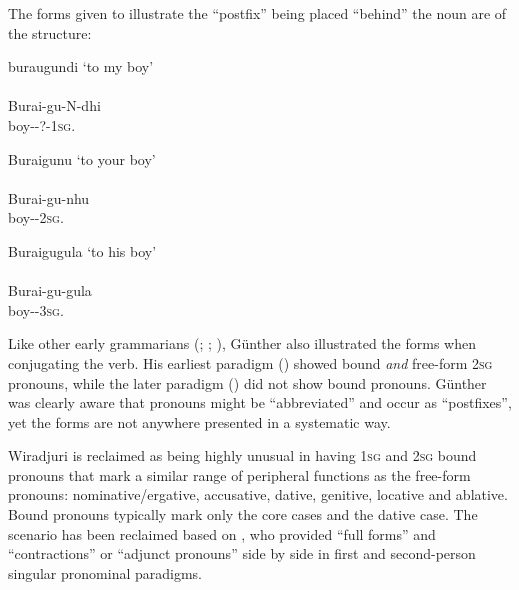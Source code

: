 The forms given to illustrate the “postfix” being placed “behind” the noun are of the structure:

\ea\label{ex:key:3}
buraugundi
\glt `to my boy' \\
\citep[355]{gunther_lecture_1840} \\
\gll Burai-gu-N-dhi \\
boy--?-1\textsc{sg}. \\
\z

\ea\label{ex:key:4}
Buraigunu
\glt `to your boy' \\
\citep[355]{gunther_lecture_1840}\\
\gll Burai-gu-nhu \\
boy--2\textsc{sg}. \\
\z

\ea\label{ex:key:5}
Buraigugula
`to his boy' \\
\citep[355]{gunther_lecture_1840} \\
\gll Burai-gu-gula \\
boy--3\textsc{sg}. \\
\z

Like other early grammarians (\citealt{teichelmann_outlines_1840}; \citealt{schurmann_vocabulary_1844}; \citealt{Spieseke_1878}), Günther also illustrated the forms when conjugating the verb. His earliest paradigm (\citeyear[77]{gunther_native_1838}) showed bound \textit{and} free-form 2\textsc{sg} pronouns, while the later paradigm (\citeyear[362]{teichelmann_outlines_1840}) did not show bound pronouns. Günther was clearly aware that pronouns might be “abbreviated” and occur as ``postfixes'', yet the forms are not anywhere presented in a systematic way.

Wiradjuri is reclaimed \citep[345]{dixon_australian_2002} as being highly unusual in having 1\textsc{sg} and 2\textsc{sg} bound pronouns that mark a similar range of peripheral functions as the free-form pronouns: nominative/ergative, accusative, dative, genitive, locative and ablative. Bound pronouns typically mark only the core cases and the dative case. The scenario has been reclaimed based on \citet[488]{hale_languages_1846}, who provided “full forms” and “contractions” or “adjunct pronouns” side by side in first and second-person singular pronominal paradigms.

